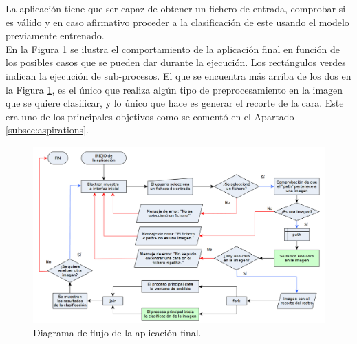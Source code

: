 \documentclass[a4paper,11pt]{book}
\begin{document}



La aplicación tiene que ser capaz de obtener un fichero de entrada, comprobar si es válido y en caso afirmativo proceder a la clasificación de este usando el modelo previamente entrenado.\\
En la Figura \ref{fig:appFlowchart} se ilustra el comportamiento de la aplicación final en función de los posibles casos que se pueden dar durante la ejecución. Los rectángulos verdes indican la ejecución de sub-procesos. El que se encuentra más arriba de los dos en la Figura \ref{fig:appFlowchart}, es el único que realiza algún tipo de preprocesamiento en la imagen que se quiere clasificar, y lo único que hace es generar el recorte de la cara. Este era uno de los principales objetivos como se comentó en el Apartado \ref{subsec:aspirations}.
\begin{figure}[t]
\centering
\includegraphics[width=1.0\linewidth]{imagenes/appFlowchart}
\caption[FlowChart]{Diagrama de flujo de la aplicación final.}
\label{fig:appFlowchart}
\end{figure}



\end{document}
